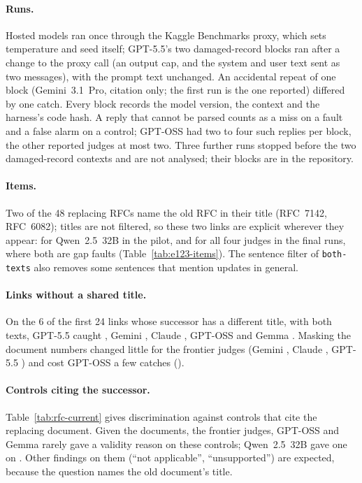 \paragraph{Runs.} Hosted models ran once through the Kaggle Benchmarks proxy, which sets temperature and seed itself;
GPT-5.5's two damaged-record blocks ran after a change to the proxy call (an output cap, and the system and user text
sent as two messages), with the prompt text unchanged. An accidental repeat of one block (Gemini~3.1~Pro, citation only;
the first run is the one reported) differed by one catch. Every block records the model version, the context and the
harness's code hash. A reply that cannot be parsed counts as a miss on a fault and a false alarm on a control; GPT-OSS
had two to four such replies per block, the other reported judges at most two. Three further runs stopped before the
two damaged-record contexts and are not analysed; their blocks are in the repository.

\paragraph{Items.} Two of the 48 replacing RFCs name the old RFC in their title (RFC~7142, RFC~6082); titles are not
filtered, so these two links are explicit wherever they appear: for Qwen~2.5~32B in the pilot, and for all four judges
in the final runs, where both are gap faults (Table~\ref{tab:e123-items}). The sentence filter of
\texttt{both-texts} also removes some sentences that mention updates in general.

\paragraph{Links without a shared title.} On the 6 of the first 24 links whose successor has a different title, with
both texts, GPT-5.5 caught \RfcTitleDifferentBothTextsGPTFiveFive, Gemini \RfcTitleDifferentBothTextsGeminiThreeOnePro,
Claude \RfcTitleDifferentBothTextsClaudeOpusFourFive, GPT-OSS \RfcTitleDifferentBothTextsGPTOSSOneTwoZeroB{} and Gemma
\RfcTitleDifferentBothTextsGemmaFourTwoSixB. Masking the document numbers changed little for the frontier judges
(Gemini \RfcCatchBothMaskedGeminiThreeOnePro, Claude \RfcCatchBothMaskedClaudeOpusFourFive, GPT-5.5
\RfcCatchBothMaskedGPTFiveFive) and cost GPT-OSS a few catches (\RfcCatchBothMaskedGPTOSSOneTwoZeroB).

\paragraph{Controls citing the successor.} Table~\ref{tab:rfc-current} gives discrimination against controls that cite
the replacing document. Given the documents, the frontier judges, GPT-OSS and Gemma rarely gave a validity reason on
these controls; Qwen~2.5~32B gave one on \RfcFABothTextsQwenThreeTwoB. Other findings on them (``not applicable'',
``unsupported'') are expected, because the question names the old document's title.

